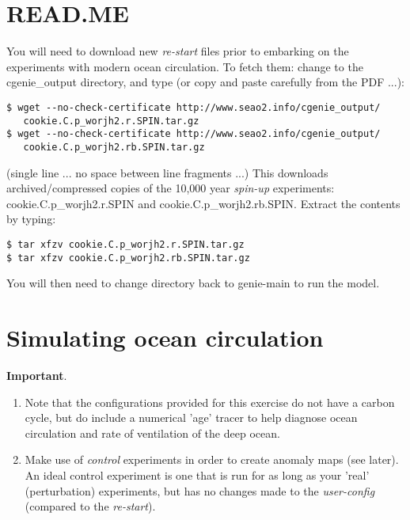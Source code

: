 \newpage

\section*{READ.ME}

You will need to download new \textit{re-start} files prior to embarking on the experiments with modern ocean circulation. To fetch them: change to the \textsf{\footnotesize cgenie\_output} directory, and type (or copy and paste carefully from the PDF ...):

\vspace{-2mm}\small\begin{verbatim}
$ wget --no-check-certificate http://www.seao2.info/cgenie_output/
   cookie.C.p_worjh2.r.SPIN.tar.gz
$ wget --no-check-certificate http://www.seao2.info/cgenie_output/
   cookie.C.p_worjh2.rb.SPIN.tar.gz
\end{verbatim}\normalsize\vspace{-2mm}
(single line ... no space between line fragments ...) This downloads  archived/compressed copies of the 10,000 year \textit{spin-up} experiments: \textsf{\footnotesize  cookie.C.p\_worjh2.r.SPIN} and \textsf{\footnotesize  cookie.C.p\_worjh2.rb.SPIN}. Extract the contents by typing:

\vspace{-2mm}\small\begin{verbatim}
$ tar xfzv cookie.C.p_worjh2.r.SPIN.tar.gz
$ tar xfzv cookie.C.p_worjh2.rb.SPIN.tar.gz
\end{verbatim}\normalsize\vspace{-2mm}
You will then need to change directory back to \textsf{\footnotesize genie-main} to run the model.

\newpage

\section{Simulating ocean circulation}

\textbf{Important}.

\begin{enumerate}[noitemsep]
\vspace{1mm}
\item Note that the configurations provided for this exercise do not have a carbon cycle, but do include a numerical 'age' tracer to help diagnose ocean circulation and rate of ventilation of the deep ocean.
\vspace{1mm}
\item Make use of \textit{control} experiments in order to create anomaly maps (see later). An ideal control experiment is one that is run for as long as your 'real' (perturbation) experiments, but has no changes made to the \textit{user-config} (compared to the \textit{re-start}).
\end{enumerate}

